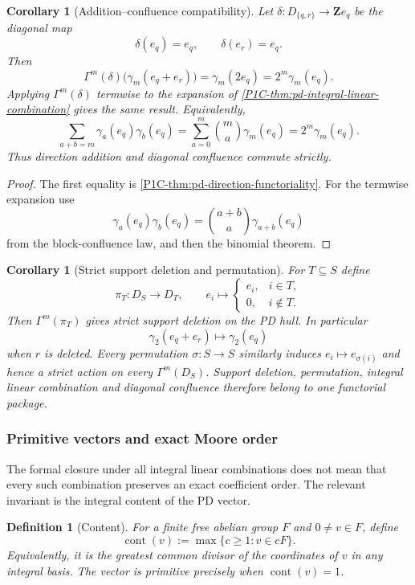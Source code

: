 \documentclass[11pt]{article}
\newtheorem{corollary}[theorem]{Corollary}
\newtheorem{definition}[theorem]{Definition}
\theoremstyle{remark}
\newcommand{\Z}{\mathbf Z}
\begin{document}
\begin{corollary}[Addition--confluence compatibility]\label{P1C-cor:pd-addition-confluence-compatibility}
Let $\delta:D_{\{q,r\}}\to\Z e_q$ be the diagonal map
\[
\delta(e_q)=e_q,
\qquad
\delta(e_r)=e_q.
\]
Then
\[
\boxed{
\Gamma^m(\delta)\bigl(\gamma_m(e_q+e_r)\bigr)=\gamma_m(2e_q)=2^m\gamma_m(e_q).}
\]
Applying $\Gamma^m(\delta)$ termwise to the expansion of \cref{P1C-thm:pd-integral-linear-combination} gives the same result. Equivalently,
\[
\sum_{a+b=m}\gamma_a(e_q)\gamma_b(e_q)=\sum_{a=0}^m\binom ma\gamma_m(e_q)=2^m\gamma_m(e_q).
\]
Thus direction addition and diagonal confluence commute strictly.
\end{corollary}

\begin{proof}
The first equality is \cref{P1C-thm:pd-direction-functoriality}. For the termwise expansion use
\[
\gamma_a(e_q)\gamma_b(e_q)=\binom{a+b}{a}\gamma_{a+b}(e_q)
\]
from the block-confluence law, and then the binomial theorem.
\end{proof}

\begin{corollary}[Strict support deletion and permutation]\label{P1C-cor:pd-support-deletion-permutation}
For $T\subseteq S$ define
\[
\pi_T:D_S\to D_T,
\qquad
e_i\longmapsto
\begin{cases}
e_i,&i\in T,\\
0,&i\notin T.
\end{cases}
\]
Then $\Gamma^m(\pi_T)$ gives strict support deletion on the PD hull. In particular
\[
\gamma_2(e_q+e_r)\longmapsto\gamma_2(e_q)
\]
when $r$ is deleted. Every permutation $\sigma:S\to S$ similarly induces $e_i\mapsto e_{\sigma(i)}$ and hence a strict action on every $\Gamma^m(D_S)$. Support deletion, permutation, integral linear combination and diagonal confluence therefore belong to one functorial package.
\end{corollary}

\subsubsection{Primitive vectors and exact Moore order}

The formal closure under all integral linear combinations does not mean that every such combination preserves an exact coefficient order. The relevant invariant is the integral content of the PD vector.

\begin{definition}[Content]\label{P1C-def:pd-content}
For a finite free abelian group $F$ and $0\ne v\in F$, define
\[
\operatorname{cont}(v):=\max\{c\ge1:v\in cF\}.
\]
Equivalently, it is the greatest common divisor of the coordinates of $v$ in any integral basis. The vector is primitive precisely when $\operatorname{cont}(v)=1$.
\end{definition}
\end{document}

